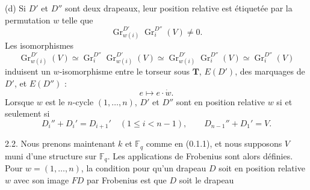 \documentclass[9pt,twoside]{extarticle}
\begin{document}
{(d) Si \(D'\) et \(D''\) sont deux drapeaux, leur position relative est étiquetée par la permutation \(w\) telle que \[
\operatorname{Gr}_{w(i)}^{D'}\operatorname{Gr}_i^{D''}(V)\ne0.
\] Les isomorphismes \[
\operatorname{Gr}_{w(i)}^{D'}(V)
\simeq\operatorname{Gr}_i^{D''}\operatorname{Gr}_{w(i)}^{D'}(V)
\simeq\operatorname{Gr}_{w(i)}^{D'}\operatorname{Gr}_i^{D''}(V)
\simeq\operatorname{Gr}_i^{D''}(V)
\] induisent un \(w\)-isomorphisme entre le torseur sous \(\mathbf T\), \(E(D')\), des marquages de \(D'\), et \(E(D'')\) : \[
e\longmapsto e\cdot\dot w.
\] Lorsque \(w\) est le \(n\)-cycle \((1,\ldots,n)\), \(D'\) et \(D''\) sont en position relative \(w\) si et seulement si \[
D_i''+D_i'=D_{i+1}'\quad(1\le i<n-1),
\qquad
D_{n-1}''+D_1'=V.
\]\par

2.2. Nous prenons maintenant \(k\) et \(\mathbb F_q\) comme en (0.1.1), et nous supposons \(V\) muni d'une structure sur \(\mathbb F_q\). Les applications de Frobenius sont alors définies. Pour \(w=(1,\ldots,n)\), la condition pour qu'un drapeau \(D\) soit en position relative \(w\) avec son image \(FD\) par Frobenius est que \(D\) soit le drapeau\par
}
\end{document}
